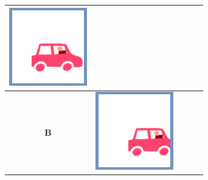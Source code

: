 \documentclass[12pt]{article}
\begin{document}
\begin{minipage}{\textwidth}
\begin{table}[H]
\begin{tabulary}{\linewidth}{|C|CCCC|}
				\vspace{0.01cm}\includegraphics[width=\linewidth]{option3}
				\\ \hline 
				\textbf{B} &
				\vspace{0.01cm}\includegraphics[width=\linewidth]{option4} &

\end{tabulary}
\end{table}
\end{minipage}
\end{document}
